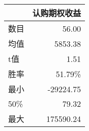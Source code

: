 \begin{tabular}{lr}
\toprule
{} &    认购期权收益 \\
\midrule
数目 &     56.00 \\
均值  &   5853.38 \\
t值  &  1.51 \\
胜率 & 51.79\% \\
最小   & -29224.75 \\

50\%   &     79.32 \\

最大  & 175590.24 \\
\bottomrule
\end{tabular}
